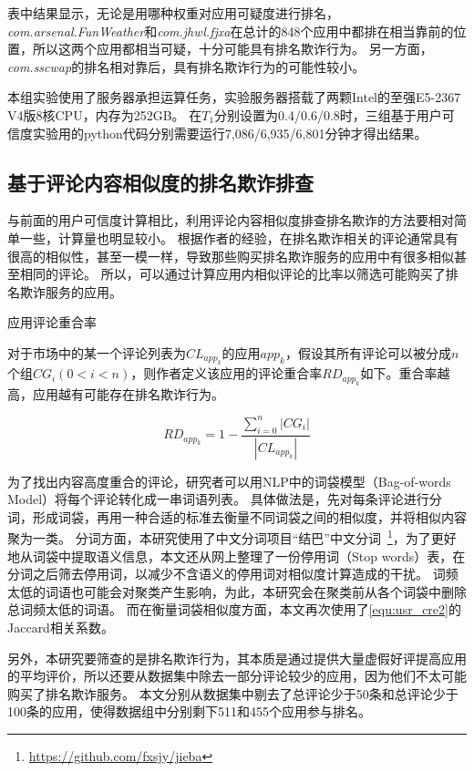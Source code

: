 表中结果显示，无论是用哪种权重对应用可疑度进行排名，\emph{com.arsenal.FunWeather}和\emph{com.jhwl.fjxa}在总计的848个应用中都排在相当靠前的位置，所以这两个应用都相当可疑，十分可能具有排名欺诈行为。
另一方面，\emph{com.sscwap}的排名相对靠后，具有排名欺诈行为的可能性较小。

本组实验使用了服务器承担运算任务，实验服务器搭载了两颗Intel的至强E5-2367 V4版8核CPU，内存为252GB。
在$T_1$分别设置为0.4/0.6/0.8时，三组基于用户可信度实验用的python代码分别需要运行7,086/6,935/6,801分钟才得出结果。

\subsection{基于评论内容相似度的排名欺诈排查}
与前面的用户可信度计算相比，利用评论内容相似度排查排名欺诈的方法要相对简单一些，计算量也明显较小。
根据作者的经验，在排名欺诈相关的评论通常具有很高的相似性，甚至一模一样，导致那些购买排名欺诈服务的应用中有很多相似甚至相同的评论。
所以，可以通过计算应用内相似评论的比率以筛选可能购买了排名欺诈服务的应用。

\begin{Def}
	应用评论重合率

	对于市场中的某一个评论列表为$CL_{app_k}$的应用$app_k$，假设其所有评论可以被分成$n$个组$CG_i (0 <i < n)$，则作者定义该应用的评论重合率$RD_{app_k}$如下。重合率越高，应用越有可能存在排名欺诈行为。
\end{Def}

\begin{equation}
	RD_{app_k} = 1 - \frac{\sum_{i=0}^n|CG_i|}{|CL_{app_k}|}
	\label{equ:cmt_simi1}
\end{equation}
\vspace{0.5mm}

为了找出内容高度重合的评论，研究者可以用NLP中的词袋模型（Bag-of-words Model）将每个评论转化成一串词语列表。
具体做法是，先对每条评论进行分词，形成词袋，再用一种合适的标准去衡量不同词袋之间的相似度，并将相似内容聚为一类。
分词方面，本研究使用了中文分词项目“结巴”中文分词~\footnote{\url{https://github.com/fxsjy/jieba}}，为了更好地从词袋中提取语义信息，本文还从网上整理了一份停用词（Stop words）表，在分词之后筛去停用词，以减少不含语义的停用词对相似度计算造成的干扰。
词频太低的词语也可能会对聚类产生影响，为此，本研究会在聚类前从各个词袋中删除总词频太低的词语。
而在衡量词袋相似度方面，本文再次使用了\autoref{equ:usr_cre2}的Jaccard相关系数。

另外，本研究要筛查的是排名欺诈行为，其本质是通过提供大量虚假好评提高应用的平均评价，所以还要从数据集中除去一部分评论较少的应用，因为他们不太可能购买了排名欺诈服务。
本文分别从数据集中剔去了总评论少于50条和总评论少于100条的应用，使得数据组中分别剩下511和455个应用参与排名。

